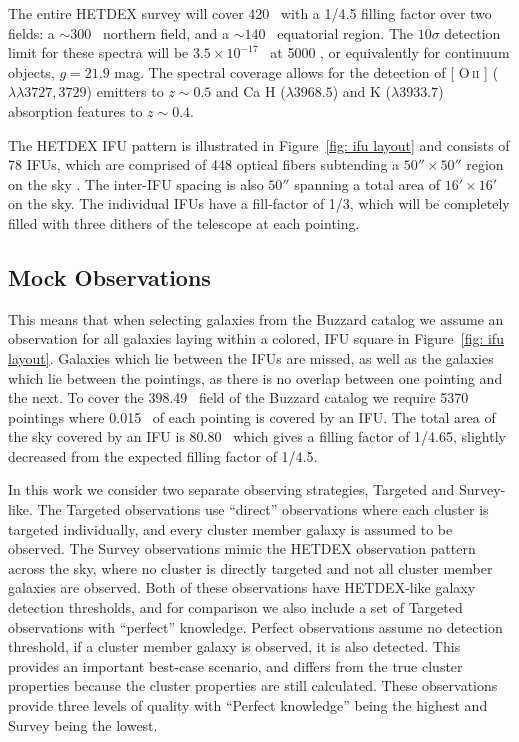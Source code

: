 \documentclass[fleqn,usenatbib]{mnras}
\makeatletter
\DeclareRobustCommand{\ion}[2]{%
\relax\ifmmode
\ifx\testbx\f@series
{\mathbf{#1\,\mathsc{#2}}}\else
{\mathrm{#1\,\mathsc{#2}}}\fi
\else\textup{#1\,{\mdseries\textsc{#2}}}%
\fi}
\makeatother
\begin{document}
The entire HETDEX survey will cover 420 \degsq\ with a 1/4.5 filling factor over two fields: a $\sim 300$ \degsq\ northern field, and a $\sim 140$ \degsq\ equatorial region. The $10 \sigma$ detection limit for these spectra will be $3.5\times10^{-17}$ \ergscm\ at 5000 \AAA, or equivalently for continuum objects, $g = 21.9$ mag. The spectral coverage allows for the detection of [\ion{O}{ii}] ($\lambda\lambda 3727,3729$) emitters to $z\sim 0.5$ and Ca H ($\lambda 3968.5$) and K ($\lambda 3933.7$) absorption features to $z\sim 0.4$.

The HETDEX IFU pattern is illustrated in Figure~\ref{fig: ifu layout} and consists of 78 IFUs, which are comprised of 448 optical fibers subtending a $50'' \times 50''$ region on the sky \citep{Kelz2014}. The inter-IFU spacing is also $50''$ spanning a total area of $16'\times 16'$ on the sky. The individual IFUs have a fill-factor of 1/3, which will be completely filled with three dithers of the telescope at each pointing. 

\subsection{Mock Observations}\label{sec: observations}
This means that when selecting galaxies from the Buzzard catalog we assume an observation for all galaxies laying within a colored, IFU square in Figure~\ref{fig: ifu layout}. Galaxies which lie between the IFUs are missed, as well as the galaxies which lie between the pointings, as there is no overlap between one pointing and the next. To cover the 398.49 \degsq\ field of the Buzzard catalog we require 5370 pointings where 0.015 \degsq\ of each pointing is covered by an IFU. The total area of the sky covered by an IFU is 80.80 \degsq\ which gives a filling factor of 1/4.65, slightly decreased from the expected filling factor of 1/4.5.

In this work we consider two separate observing strategies, Targeted and Survey-like. The Targeted observations use ``direct'' observations where each cluster is targeted individually, and every cluster member galaxy is assumed to be observed. The Survey observations mimic the HETDEX observation pattern across the sky, where no cluster is directly targeted and not all cluster member galaxies are observed. Both of these observations have HETDEX-like galaxy detection thresholds, and for comparison we also include a set of Targeted observations with ``perfect'' knowledge. Perfect observations assume no detection threshold, if a cluster member galaxy is observed, it is also detected. This provides an important best-case scenario, and differs from the true cluster properties because the cluster properties are still calculated. These observations provide three levels of quality with ``Perfect knowledge'' being the highest and Survey being the lowest.
\end{document}
